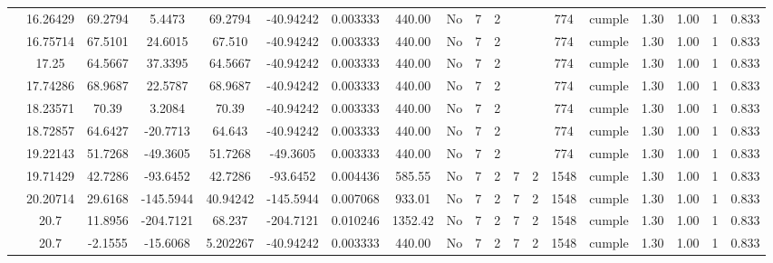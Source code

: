 \begin{table}[H]
{\begin{tabular}{|c|c|c|c|c|c|r|c|c|c|c|c|c|c|c|c|c|c|c|}
\cline{2-19}        & 16.26429 & 69.2794 & 5.4473 & 69.2794 & -40.94242 & 0.003333 & 440.00 & No  & 7   & 2   &     &     & 774 & \cellcolor[rgb]{ .776,  .937,  .808}cumple & 1.30 & 1.00 & 1   & 0.833 \bigstrut\\
\cline{2-19}        & 16.75714 & 67.5101 & 24.6015 & 67.510 & -40.94242 & 0.003333 & 440.00 & No  & 7   & 2   &     &     & 774 & \cellcolor[rgb]{ .776,  .937,  .808}cumple & 1.30 & 1.00 & 1   & 0.833 \bigstrut\\
\cline{2-19}        & 17.25 & 64.5667 & 37.3395 & 64.5667 & -40.94242 & 0.003333 & 440.00 & No  & 7   & 2   &     &     & 774 & \cellcolor[rgb]{ .776,  .937,  .808}cumple & 1.30 & 1.00 & 1   & 0.833 \bigstrut\\
\cline{2-19}        & 17.74286 & 68.9687 & 22.5787 & 68.9687 & -40.94242 & 0.003333 & 440.00 & No  & 7   & 2   &     &     & 774 & \cellcolor[rgb]{ .776,  .937,  .808}cumple & 1.30 & 1.00 & 1   & 0.833 \bigstrut\\
\cline{2-19}        & 18.23571 & 70.39 & 3.2084 & 70.39 & -40.94242 & 0.003333 & 440.00 & No  & 7   & 2   &     &     & 774 & \cellcolor[rgb]{ .776,  .937,  .808}cumple & 1.30 & 1.00 & 1   & 0.833 \bigstrut\\
\cline{2-19}        & 18.72857 & 64.6427 & -20.7713 & 64.643 & -40.94242 & 0.003333 & 440.00 & No  & 7   & 2   &     &     & 774 & \cellcolor[rgb]{ .776,  .937,  .808}cumple & 1.30 & 1.00 & 1   & 0.833 \bigstrut\\
\cline{2-19}        & 19.22143 & 51.7268 & -49.3605 & 51.7268 & -49.3605 & 0.003333 & 440.00 & No  & 7   & 2   &     &     & 774 & \cellcolor[rgb]{ .776,  .937,  .808}cumple & 1.30 & 1.00 & 1   & 0.833 \bigstrut\\
\cline{2-19}        & 19.71429 & 42.7286 & -93.6452 & 42.7286 & -93.6452 & 0.004436 & 585.55 & No  & 7   & 2   & 7   & 2   & 1548 & \cellcolor[rgb]{ .776,  .937,  .808}cumple & 1.30 & 1.00 & 1   & 0.833 \bigstrut\\
\cline{2-19}        & 20.20714 & 29.6168 & -145.5944 & 40.94242 & -145.5944 & 0.007068 & 933.01 & No  & 7   & 2   & 7   & 2   & 1548 & \cellcolor[rgb]{ .776,  .937,  .808}cumple & 1.30 & 1.00 & 1   & 0.833 \bigstrut\\
\cline{2-19}        & \cellcolor[rgb]{ .851,  .882,  .949}20.7 & 11.8956 & -204.7121 & 68.237 & -204.7121 & 0.010246 & 1352.42 & No  & 7   & 2   & 7   & 2   & 1548 & \cellcolor[rgb]{ .776,  .937,  .808}cumple & 1.30 & 1.00 & 1   & 0.833 \bigstrut\\
\cline{2-19}        & \cellcolor[rgb]{ .851,  .882,  .949}20.7 & -2.1555 & -15.6068 & 5.202267 & -40.94242 & 0.003333 & 440.00 & No  & 7   & 2   & 7   & 2   & 1548 & \cellcolor[rgb]{ .776,  .937,  .808}cumple & 1.30 & 1.00 & 1   & 0.833 \bigstrut\\

\end{tabular}}
\end{table}
